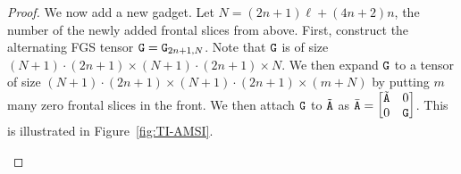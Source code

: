 \begin{proof}
We now add a new gadget. Let $N=(2n+1)\ell+(4n+2)n$, the number of the newly added frontal slices from above. First, construct the alternating FGS tensor $\mathtt{G}=\mathtt{G}_{2n+1, N}$. Note that $\mathtt{G}$ is of size $(N+1)\cdot (2n+1)\times (N+1)\cdot (2n+1)\times N$. We then expand $\mathtt{G}$ to a tensor of size $(N+1)\cdot (2n+1)\times (N+1)\cdot (2n+1)\times (m+N)$ by putting $m$ many zero frontal slices in the front.
%
We then attach $\mathtt{G}$ to $\tilde{\mathtt{A}}$ as $\bar{\mathtt{A}}=\begin{bmatrix}
	\tilde{\mathtt{A}} & 0 \\
	0 & \mathtt{G}
\end{bmatrix}$. This is illustrated in Figure~\ref{fig:TI-AMSI}.
\begin{figure}[!htbp]
	
	\centering
	
	
	
	\begin{tikzpicture}[x=0.75pt,y=0.75pt,yscale=-0.7,xscale=0.7]
		

\end{tikzpicture}
\end{figure}
\end{proof}
